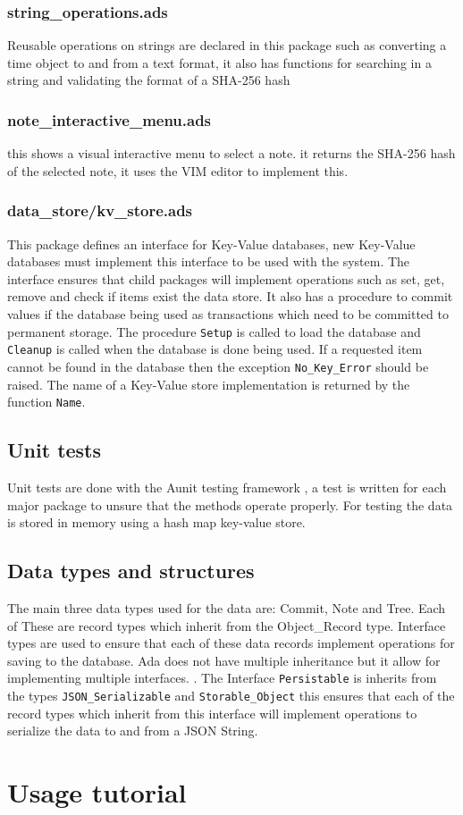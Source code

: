 \documentclass[12pt,a4paper]{article}
\newcommand{\codetext}[1]{\colorbox{light-gray}{\texttt{#1}}}
\begin{document}
\subsubsection{string\_operations.ads}
Reusable operations on strings are declared in this package such as converting a time object to and from a text format, it also has functions for searching in a string and validating the format of a SHA-256 hash

\subsubsection{note\_interactive\_menu.ads}
this shows a visual interactive menu to select a note. it returns the SHA-256 hash of the selected note, it uses the VIM editor to implement this.

\subsubsection{data\_store/kv\_store.ads}
This package defines an interface for Key-Value databases, new Key-Value databases must implement this interface to be used with the system. The interface ensures that child packages will implement operations such as set, get, remove and check if items exist the data store. It also has a procedure to commit values if the database being used as transactions which need to be committed to permanent storage. The procedure \codetext{Setup} is called to load the database and \codetext{Cleanup} is called when the database is done being used. If a requested item cannot be found in the database then the exception \codetext{No\_Key\_Error} should be raised. The name of a Key-Value store implementation is returned by the function \codetext{Name}.

\subsection{Unit tests}
Unit tests are done with the Aunit testing framework \cite{Aunit},  a test is written for each major package to unsure that the methods operate properly. For testing the data is stored in memory using a hash map key-value store.

\subsection{Data types and structures}
The main three data types used for the data are: Commit, Note and Tree. Each of These are record types which inherit from the Object\_Record type. Interface types are used to ensure that each of these data records implement operations for saving to the database. Ada does not have multiple inheritance but it allow for implementing multiple interfaces.  \cite{Ada-Interface-Types}. The Interface \codetext{Persistable} is inherits from the types \codetext{JSON\_Serializable} and \codetext{Storable\_Object} this ensures that each of the record types which inherit from this interface will implement operations to serialize the data to and from a JSON \cite{rfc7159} String.

\section{Usage tutorial}



\end{document}
